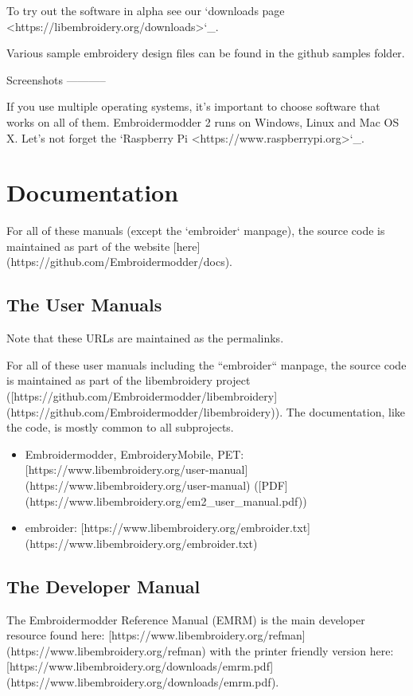 To try out the software in alpha see our `downloads page <https://libembroidery.org/downloads>`_.

Various sample embroidery design files can be found in
the github samples folder.

Screenshots
-----------

If you use multiple operating systems, it's important to choose
software that works on all of them. Embroidermodder 2 runs on Windows,
Linux and Mac OS X. Let's not forget the `Raspberry Pi <https://www.raspberrypi.org>`_.

\section{Documentation}

For all of these manuals (except the `embroider` manpage),
the source code is maintained as part
of the website [here](https://github.com/Embroidermodder/docs).

\subsection{The User Manuals}

Note that these URLs are maintained as the permalinks.

For all of these user manuals including the ``embroider`` manpage,
the source code is maintained as part
of the libembroidery project ([https://github.com/Embroidermodder/libembroidery](https://github.com/Embroidermodder/libembroidery)).
The documentation, like the code, is mostly common to all subprojects.

\begin{itemize}
\item Embroidermodder, EmbroideryMobile, PET: [https://www.libembroidery.org/user-manual](https://www.libembroidery.org/user-manual) ([PDF](https://www.libembroidery.org/em2_user_manual.pdf))
\item embroider: [https://www.libembroidery.org/embroider.txt](https://www.libembroidery.org/embroider.txt)
\end{itemize}

\subsection{The Developer Manual}

The Embroidermodder Reference Manual (EMRM) is the main developer 
resource found here: [https://www.libembroidery.org/refman](https://www.libembroidery.org/refman) with the printer friendly version here: [https://www.libembroidery.org/downloads/emrm.pdf](https://www.libembroidery.org/downloads/emrm.pdf).

